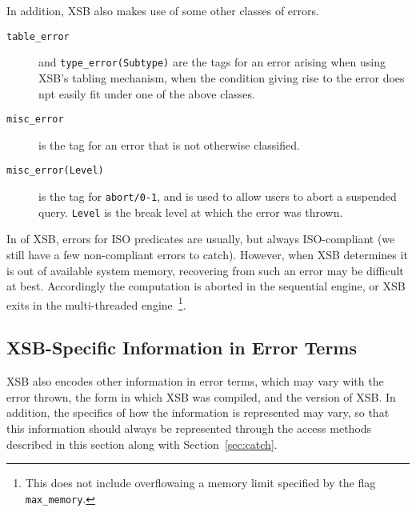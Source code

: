 \noindent
In addition, XSB also makes use of some other classes of errors.
%
\begin{description}
\item[{\tt table\_error}] and {\tt type\_error(Subtype)} are the tags for an
  error arising when using XSB's tabling mechanism, when the condition
  giving rise to the error does npt easily fit under one of the above
  classes.
%
%
\item[{\tt misc\_error}] is the tag for an error that is not
  otherwise classified.
%
\item[{\tt misc\_error(Level)}] is the tag for {\tt abort/0-1}, and is
  used to allow users to abort a suspended query.  {\tt Level} is the
  break level at which the error was thrown.
%
\end{description}

In \version{} of XSB, errors for ISO predicates are usually, but
always ISO-compliant (we still have a few non-compliant errors to
catch).  However, when XSB determines it is out of available system
memory, recovering from such an error may be difficult at best.
Accordingly the computation is aborted in the sequential engine, or
XSB exits in the multi-threaded engine~\footnote{This does not include
  overflowaing a memory limit specified by the flag {\tt
    max\_memory}.}.

\subsection{XSB-Specific Information in Error Terms}

XSB also encodes other information in error terms, which may vary with
the error thrown, the form in which XSB was compiled, and the version
of XSB.  In addition, the specifics of how the information is
represented may vary, so that this information should always be
represented through the access methods described in this section along
with Section~\ref{sec:catch}.

